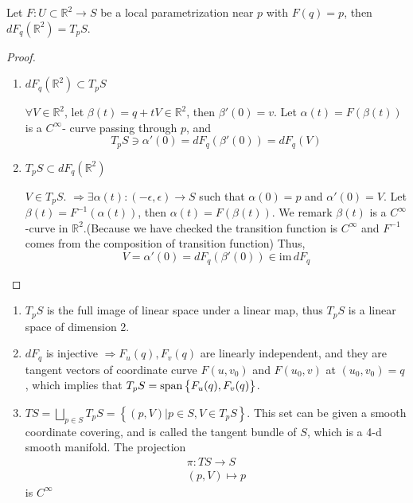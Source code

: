 \begin{proposition}
    Let \(F\colon U\subset \mathbb{R}^2\to S\) be a local parametrization near \(p\) with \(F(q)=p\), then \(dF_q\left(\mathbb{R}^2\right)=T_pS\).
\end{proposition}
\begin{proof}
    \hfill
    \begin{enumerate}[(1)]
        \item \(dF_q\left(\mathbb{R}^2\right)\subset T_p S\)

              \(\forall V\in \mathbb{R}^2\), let \(\beta(t)=q+t V\in \mathbb{R}
              ^2\), then \(\beta'(0)=v\). Let \(\alpha(t)=F\left(\beta(t)\right)
              \) is a \(C^\infty\)- curve passing through \(p\), and
              \[T_p S\ni \alpha'(0)=dF_q\left(\beta'(0)\right)=dF_q(V)\]
        \item \(T_p S\subset dF_q\left(\mathbb{R}^2\right)\)

              \(V\in T_p S\). \(\Rightarrow \exists \alpha(t)\colon (-\epsilon,
              \epsilon)\to S\) such that \(\alpha(0)=p\) and \(\alpha'(0)=V\).
              Let $\beta(t)=F^{-1}\left(\alpha(t)\right)$, then \(\alpha(t)=F
              \left(\beta(t)\right)\). We remark \(\beta(t)\) is a \(C^\infty\)
              -curve in \(\mathbb{R}^2\).(Because we have checked the transition
              function is \(C^\infty\) and \(F^{-1}\) comes from the composition
              of transition function) Thus,
              \[V=\alpha'(0)=dF_q\left(\beta'(0)\right)\in \mathrm{im}\,dF_q\]
    \end{enumerate}
\end{proof}
\begin{remark}
    \hfill
    \begin{enumerate}[(1)]
        \item \(T_p S\) is the full image of linear space under a linear 
        map, thus \(T_pS\) is a linear space of dimension 2.
        \item \(dF_q\) is injective \(\Rightarrow\)\(F_u(q),F_v(q)\) are
              linearly independent, and they are tangent vectors of coordinate
              curve \(F(u,v_0)\) and \(F(u_0,v)\) at \((u_0,v_0)=q\),
              which implies that \(T_pS =\operatorname{span}\left\{F_u(q),F_v(q)\right\}\).
        \item \(TS=\bigsqcup_{p\in S}T_p S=
              \left\{(p,V)|p\in S,V\in T_pS\right\}\).
              This set can be given a smooth coordinate covering, and is called
              the tangent bundle of \(S\), which is a 4-d smooth manifold. The
              projection
              \begin{align*}
                  \pi\colon TS\to S \\
                  (p,V)\mapsto p
              \end{align*}
              is \(C^\infty\)
    \end{enumerate}
\end{remark}

